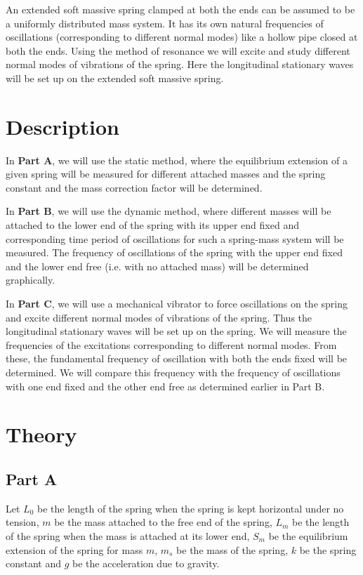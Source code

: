 An extended soft massive spring clamped at both the ends can be assumed to be a uniformly distributed mass system. It has its own natural frequencies of oscillations (corresponding to different normal modes) like a hollow pipe closed at both the ends. Using the method of resonance we will excite and study different normal modes of vibrations of the spring. Here the longitudinal stationary waves will be set up on the extended soft massive spring. 

\section*{Description}

In \textbf{Part A}, we will use the static method, where the equilibrium extension of a given spring will be measured for different attached masses and the spring constant and the mass correction factor will be determined. 

In \textbf{Part B}, we will use the dynamic method, where different masses will be attached to the lower end of the spring with its upper end fixed and corresponding time period of oscillations for such a spring-mass system will be measured. The frequency of oscillations of the spring with the upper end fixed and the lower end free (i.e. with no attached mass) will be determined graphically. 

In \textbf{Part C}, we will use a mechanical vibrator to force oscillations on the spring and excite different normal modes of vibrations of the spring. Thus the longitudinal stationary waves will be set up on the spring. We will measure the frequencies of the excitations corresponding to different normal modes. From these, the fundamental frequency of oscillation with both the ends fixed will be determined. We will compare this frequency with the frequency of oscillations with one end fixed and the other end free as determined earlier in Part B.



\section*{Theory}

\subsection*{Part A}

Let $L_0$ be the length of the spring when the spring is kept horizontal under no tension, $m$ be the mass attached to the free end of the spring, $L_m$ be the length of the spring when the mass is attached at its lower end, $S_m$ be the equilibrium extension of the spring for mass $m$, $m_s$ be the mass of the spring, $k$ be the spring constant and $g$ be the acceleration due to gravity.

